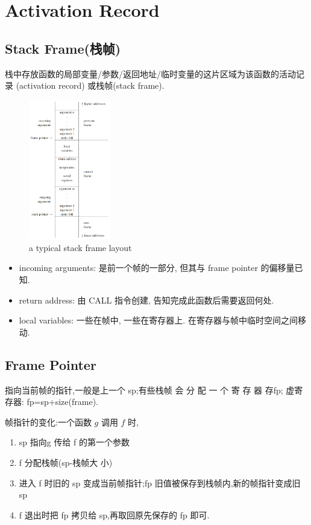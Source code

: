 \newpage
\section{Activation Record}
\subsection{Stack Frame(栈帧)}
\begin{definition}
    栈中存放函数的局部变量/参数/返回地址/临时变量的这片区域为该函数的活动记录 (activation record) 或栈帧(stack frame).
\end{definition}
\begin{figure}[!htb]
    \centering
    \includegraphics[width=0.319\textwidth]{pic/CP678/a typical stack frame layout.png}
    \caption{a typical stack frame layout}
\end{figure}
\begin{itemize}
    \item incoming arguments: 是前一个帧的一部分, 但其与 frame pointer 的偏移量已知.
    \item return address: 由 CALL 指令创建, 告知完成此函数后需要返回何处.
    \item local variables: 一些在帧中, 一些在寄存器上. 在寄存器与帧中临时空间之间移动.
\end{itemize}

\subsection{Frame Pointer}
指向当前帧的指针,一般是上一个 sp;有些栈帧 会 分 配 一 个 寄 存 器 存fp; 虚寄存器: fp=sp+size(frame). 

帧指针的变化:一个函数 $g$ 调用 $f$ 时,
\begin{enumerate}
    \item sp 指向g 传给 f 的第一个参数
    \item f 分配栈帧(sp-栈帧大 小)
    \item 进入 f 时旧的 sp 变成当前帧指针;fp 旧值被保存到栈帧内,新的帧指针变成旧 sp
    \item f 退出时把 fp 拷贝给 sp,再取回原先保存的 fp 即可.
\end{enumerate}

